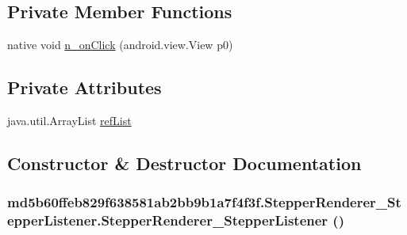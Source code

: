 \subsection*{Private Member Functions}
\begin{CompactItemize}
\item 
native void \hyperlink{classmd5b60ffeb829f638581ab2bb9b1a7f4f3f_1_1_stepper_renderer___stepper_listener_3b1a851b9378c507c98de8009e253df2}{n\_\-onClick} (android.view.View p0)
\end{CompactItemize}
\subsection*{Private Attributes}
\begin{CompactItemize}
\item 
java.util.ArrayList \hyperlink{classmd5b60ffeb829f638581ab2bb9b1a7f4f3f_1_1_stepper_renderer___stepper_listener_7b30f64618d4b4b7a77c41568e675599}{refList}
\end{CompactItemize}


\subsection{Constructor \& Destructor Documentation}
\hypertarget{classmd5b60ffeb829f638581ab2bb9b1a7f4f3f_1_1_stepper_renderer___stepper_listener_a5be37bc90ed0315ea45de354057b0ab}{
\subsubsection[{StepperRenderer\_\-StepperListener}]{\setlength{\rightskip}{0pt plus 5cm}md5b60ffeb829f638581ab2bb9b1a7f4f3f.StepperRenderer\_\-StepperListener.StepperRenderer\_\-StepperListener ()}}
\label{classmd5b60ffeb829f638581ab2bb9b1a7f4f3f_1_1_stepper_renderer___stepper_listener_a5be37bc90ed0315ea45de354057b0ab}




